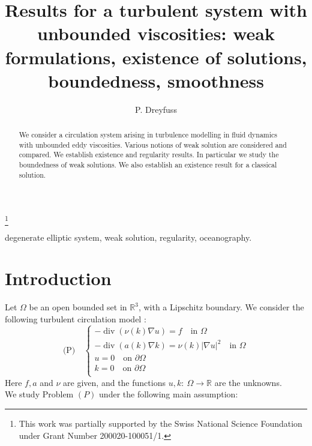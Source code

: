 \documentclass{elsart}
\begin{document}
\begin{frontmatter}

\leftskip=2pc
\title{Results for a turbulent system with unbounded viscosities:
  weak formulations, existence of solutions, boundedness, smoothness}
\thanks{This work was partially supported by the Swiss National Science Foundation under Grant Number 200020-100051/1.}
\author{P. Dreyfuss}
\address{Institut Elie Cartan, UMR 7502,  
Nancy-Universit\'e, CNRS, INRIA, France}

\begin{abstract}
We consider a circulation system arising in
 turbulence modelling in fluid dynamics with unbounded eddy
 viscosities. Various notions of weak solution are 
considered and compared. We establish existence and regularity
 results. In particular we study the boundedness of weak solutions. We
 also establish an existence result for a classical solution.
\end{abstract} 

\begin{keyword}
degenerate elliptic system, weak solution, regularity, oceanography.
\end{keyword}

\end{frontmatter}

 
\section{Introduction}

Let $\Omega$ be an open bounded set in $\mathbb R^3$, with a Lipschitz boundary. We consider 
the following turbulent circulation model : 
$$
\text{(P)}  \quad\left\{
	\begin{array}{l} 
	-{\operatorname{div}}(\nu(k)\nabla u) = f \quad \text{in } \Omega \\ 
        -{\operatorname{div}}(a(k)\nabla k) = \nu(k)| \nabla u|^2 \quad \text{in } \Omega \\ 
 	u = 0 \quad \text{on } \partial \Omega \\ 
	k = 0 \quad \text{on } \partial \Omega \\ 
	\end{array}
	\right. 
$$ 
Here $f, a$ and $\nu$ are given, and the functions $u,k: \ \Omega \to
\mathbb R$ are the unknowns. \\

We study Problem $(P)$ under the following main assumption: 
\end{document}
